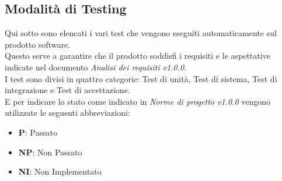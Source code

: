 \documentclass[10pt]{article}
\begin{document}
\begin{justify}

\newpage

\section{Modalità di Testing}
Qui sotto sono elencati i vari test che vengono eseguiti automaticamente sul prodotto software.\\
Questo serve a garantire che il prodotto soddisfi i requisiti e le aspettative indicate nel documento \textit{Analisi dei requisiti v1.0.0}.\\
I test sono divisi in quattro categorie: Test di unità, Test di sistema, Test di integrazione e Test di accettazione.\\
E per indicare lo stato come indicato in \textit{Norme di progetto v1.0.0} vengono utilizzate le seguenti abbreviazioni:
\begin{itemize}
\item \textbf{P}: Passato
\item \textbf{NP}: Non Passato
\item \textbf{NI}: Non Implementato
\end{itemize}


\end{justify}
\end{document}
